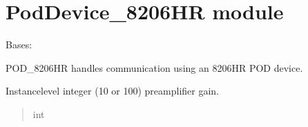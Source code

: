 \documentclass[letterpaper,10pt,english]{sphinxmanual}
\begin{document}
\section{PodDevice\_8206HR module}
\label{\detokenize{PodDevice_8206HR:module-PodDevice_8206HR}}\label{\detokenize{PodDevice_8206HR:poddevice-8206hr-module}}\label{\detokenize{PodDevice_8206HR::doc}}

\begin{fulllineitems}
\label{\detokenize{PodDevice_8206HR:PodDevice_8206HR.POD_8206HR}}
\pysigstartsignatures
{}
\pysigstopsignatures
\sphinxAtStartPar
Bases: {\hyperref[\detokenize{BasicPodProtocol:BasicPodProtocol.POD_Basics}]{}}

\sphinxAtStartPar
POD\_8206HR handles communication using an 8206HR POD device.

\begin{fulllineitems}
\label{\detokenize{PodDevice_8206HR:PodDevice_8206HR.POD_8206HR._preampGain}}
\pysigstartsignatures
{}
\pysigstopsignatures
\sphinxAtStartPar
Instance\sphinxhyphen{}level integer (10 or 100) preamplifier gain.
\begin{quote}\begin{description}
\sphinxAtStartPar
int

\end{description}\end{quote}

\end{fulllineitems}


\end{fulllineitems}
\end{document}
